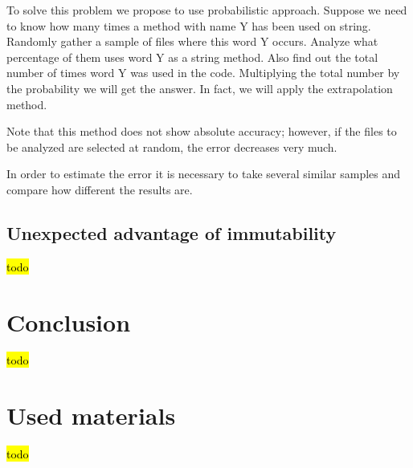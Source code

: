 \documentclass[anonymous,sigplan,review,11pt,nonacm,natbib=false]{acmart}
\begin{document}
    To solve this problem we propose to use probabilistic approach. Suppose we need to know how many times a method with name Y has been used on string. Randomly gather a sample of files where this word Y occurs. Analyze what percentage of them uses word Y as a string method. Also find out the total number of times word Y was used in the code. Multiplying the total number by the probability we will get the answer.
    In fact, we will apply the extrapolation method.

    Note that this method does not show absolute accuracy; however, if the files to be analyzed are selected at random, the error decreases very much.

    In order to estimate the error it is necessary to take several similar samples and compare how different the results are.

    \subsection{Unexpected advantage of immutability}

    \hl{todo}

    \section{Conclusion}\label{sec:conclusion}

    \hl{todo}

    \section{Used materials}

    \hl{todo}

    \printbibliography
\end{document}
